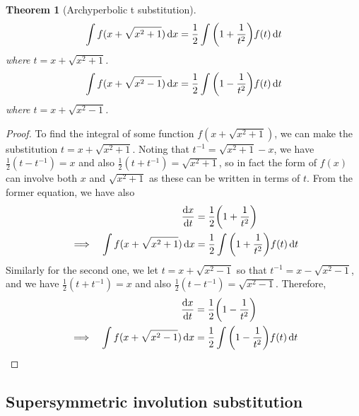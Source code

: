 \documentclass[fleqn,a4paper,11pt]{article}
\newtheorem{theorem}{Theorem}[section]
\begin{document}
    \begin{theorem}[Archyperbolic t substitution]
    \begin{equation*}
    \int f(x + \sqrt{x^2 + 1}) \dd{x}
        = \frac 12 \int \pqty{1 + \frac 1{t^2}}f(t) \dd{t}
    \end{equation*}
    where \(t = x + \sqrt{x^2 + 1}\).
    \begin{equation*}
    \int f(x + \sqrt{x^2 - 1}) \dd{x}
        = \frac 12 \int \pqty{1 - \frac 1{t^2}}f(t) \dd{t}
    \end{equation*}
    where \(t = x + \sqrt{x^2 - 1}\).
    \end{theorem}
    \begin{proof}
    To find the integral of some function \(f(x + \sqrt{x^2 + 1})\), we can make
    the substitution \(t = x + \sqrt{x^2 + 1}\). Noting that
    \(t^{-1} = \sqrt{x^2 + 1} - x\), we have \(\frac 12(t - t^{-1}) = x\)
    and also \(\frac 12(t + t^{-1}) = \sqrt{x^2 + 1}\), so in fact the form of
    \(f(x)\) can involve both \(x\) and \(\sqrt{x^2 + 1}\) as these can be
    written in terms of \(t\). From the former equation, we have also
    \begin{alignat*}{2}
    && \dv{x}{t} &= \frac 12\pqty{1 + \frac 1{t^2}} \\
    &\implies& \int f(x + \sqrt{x^2 + 1}) \dd{x}
        &= \frac 12 \int \pqty{1 + \frac 1{t^2}}f(t) \dd{t}
    \end{alignat*}
    Similarly for the second one, we let \(t = x + \sqrt{x^2 - 1}\) so that
    \(t^{-1} = x - \sqrt{x^2 - 1}\), and we have \(\frac 12(t + t^{-1}) = x\)
    and also \(\frac 12(t - t^{-1}) = \sqrt{x^2 - 1}\). Therefore,
    \begin{alignat*}{2}
    && \dv{x}{t} &= \frac 12\pqty{1 - \frac 1{t^2}} \\
    &\implies& \int f(x + \sqrt{x^2 - 1}) \dd{x}
        &= \frac 12 \int \pqty{1 - \frac 1{t^2}}f(t) \dd{t} \qedhere
    \end{alignat*}
    \end{proof}

    \subsection{Supersymmetric involution substitution}
\end{document}
